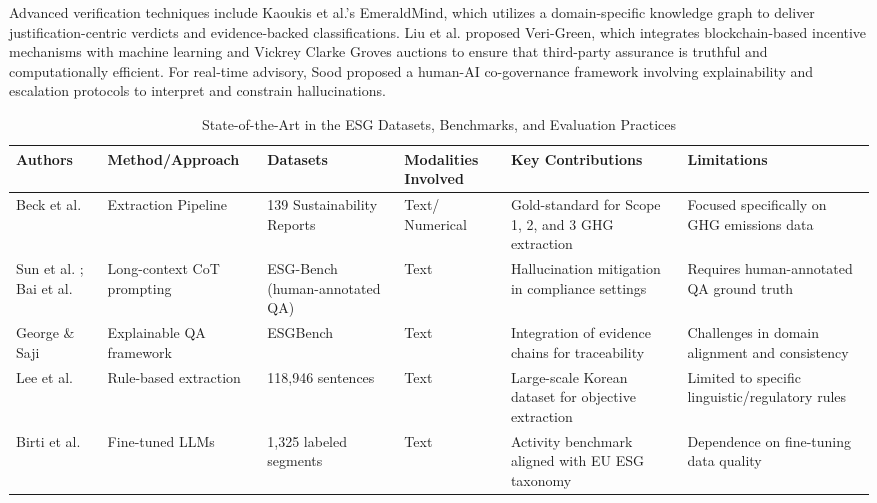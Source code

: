\documentclass[english, online, cse, master]{dithesis}
\begin{document}
Advanced verification techniques include Kaoukis et al.’s  \parencite{kaoukis__georgios_35bab107} EmeraldMind, which utilizes a domain-specific knowledge graph to deliver justification-centric verdicts and evidence-backed classifications. Liu et al.  \parencite{liyuan_liu_91c36432} proposed Veri-Green, which integrates blockchain-based incentive mechanisms with machine learning and Vickrey Clarke Groves auctions to ensure that third-party assurance is truthful and computationally efficient. For real-time advisory, Sood  \parencite{rohit_sood_cb3a4ead} proposed a human-AI co-governance framework involving explainability and escalation protocols to interpret and constrain hallucinations.



\begin{landscape}
\begin{table}[p]
\centering
\caption{State-of-the-Art in the ESG Datasets, Benchmarks, and Evaluation Practices}
\label{tab:esg-datasets-benchmarks-evaluation-practices}
\small
\renewcommand{\arraystretch}{1.2}
\begin{tabularx}{\linewidth}{|p{1.8cm}|X|X|p{1.8cm}|X|X|}
\hline
Authors & Method/Approach & Datasets & Modalities Involved & Key Contributions & Limitations \\ \hline
Beck et al.  \parencite{jacob_beck_9548a833} & Extraction Pipeline & 139 Sustainability Reports & Text/ Numerical & Gold-standard for Scope 1, 2, and 3 GHG extraction & Focused specifically on GHG emissions data \\ \hline
Sun et al.  \parencite{siqi_sun_f6a51152}; Bai et al.  \parencite{association_for_artificial_intelligence_2026_86e12eae} & Long-context CoT prompting & ESG-Bench (human-annotated QA) & Text & Hallucination mitigation in compliance settings & Requires human-annotated QA ground truth \\ \hline
George \& Saji  \parencite{s__s__george_saji_b30d4b3e} & Explainable QA framework & ESGBench & Text & Integration of evidence chains for traceability & Challenges in domain alignment and consistency \\ \hline
Lee et al.  \parencite{jaeyoung_lee_1894333c} & Rule-based extraction & 118,946 sentences & Text & Large-scale Korean dataset for objective extraction & Limited to specific linguistic/regulatory rules \\ \hline
Birti et al.  \parencite{mattia_birti_c097e3e8} & Fine-tuned LLMs & 1,325 labeled segments & Text & Activity benchmark aligned with EU ESG taxonomy & Dependence on fine-tuning data quality \\ \hline

\end{tabularx}
\end{table}
\end{landscape}
\end{document}
